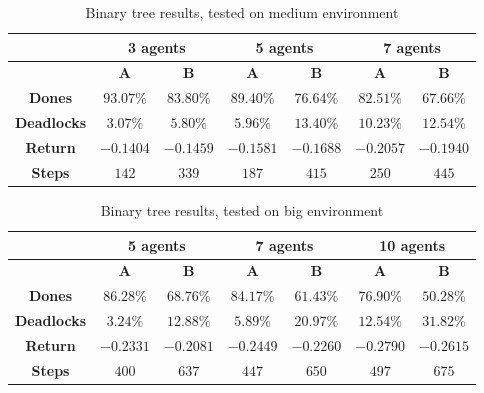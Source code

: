 \documentclass[a4paper,10pt]{report}
\begin{document}
\begin{table}[h]
	\center
	\begin{tabular}{|c|c|c|c|c|c|c|}
		\hline
							   & \multicolumn{2}{c|}{\textbf{3 agents}} & \multicolumn{2}{c|}{\textbf{5 agents}} & \multicolumn{2}{c|}{\textbf{7 agents}} \\ \hline
							   & \textbf{A} & \textbf{B} & \textbf{A} & \textbf{B} & \textbf{A} & \textbf{B} \\ \hline
		\textbf{Dones}      & $93.07\%$ & $83.80\%$ & $89.40\%$ & $76.64\%$ & $82.51\%$ & $67.66\%$ \\ \hline
		\textbf{Deadlocks}  & $3.07\%$ & $5.80\%$ & $5.96\%$ & $13.40\%$ & $10.23\%$ & $12.54\%$ \\ \hline
		\textbf{Return} & $-0.1404$ & $-0.1459$ & $-0.1581$ & $-0.1688$ & $-0.2057$ & $-0.1940$ \\ \hline
		\textbf{Steps}   & $142$ & $339$ & $187$ & $415$ & $250$ & $445$ \\ \hline
	\end{tabular}
	\caption{Binary tree results, tested on medium environment}
	\label{table:bt-medium-res}
\end{table}

\begin{table}[h]
	\center
	\begin{tabular}{|c|c|c|c|c|c|c|}
		\hline
							   & \multicolumn{2}{c|}{\textbf{5 agents}} & \multicolumn{2}{c|}{\textbf{7 agents}} & \multicolumn{2}{c|}{\textbf{10 agents}} \\ \hline
							   & \textbf{A} & \textbf{B} & \textbf{A} & \textbf{B} & \textbf{A} & \textbf{B} \\ \hline
		\textbf{Dones}      & $86.28\%$ & $68.76\%$ & $84.17\%$ & $61.43\%$ & $76.90\%$ & $50.28\%$ \\ \hline
		\textbf{Deadlocks}  & $3.24\%$ & $12.88\%$ & $5.89\%$ & $20.97\%$ & $12.54\%$ & $31.82\%$ \\ \hline
		\textbf{Return} & $-0.2331$ & $-0.2081$ & $-0.2449$ & $-0.2260$ & $-0.2790$ & $-0.2615$ \\ \hline
		\textbf{Steps}   & $400$ & $637$ & $447$ & $650$ & $497$ & $675$ \\ \hline
	\end{tabular}
	\caption{Binary tree results, tested on big environment}
	\label{table:bt-big-res}
\end{table}
\end{document}
